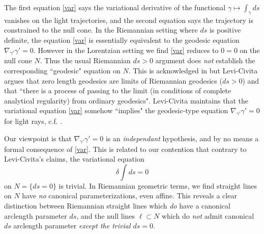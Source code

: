 \documentclass[12pt]{article}
\begin{document}
The first equation \eqref{var} says the variational derivative of the functional $\gamma \mapsto \int_\gamma ds$ vanishes on the light trajectories, and the second equation says the trajectory is constrained to the null cone. In the Riemannian setting where $ds$ is positive definite, the equation \eqref{var} is essentially equivalent to the geodesic equation $\nabla_{\gamma'} \gamma'=0$. However in the Lorentzian setting we find \eqref{var} reduces to $0=0$ on the null cone $N$. Thus the usual Riemannian $ds>0$ argument does \emph{not} establish the corresponding ``geodesic" equation on $N$. This is acknowledged in \cite[III.XI.14]{levi} but Levi-Civita argues that zero length geodesics are limits of Riemannian geodesics ($ds>0$) and that ``there is a process of passing to the limit (in conditions of complete analytical regularity) from ordinary geodesics". Levi-Civita maintains that the variational equation \eqref{var} somehow ``implies" the geodesic-type equation $\nabla_{\gamma'} \gamma'=0$ for light rays, c.f. \cite[III.XI.18]{levi}. 

Our viewpoint is that $\nabla_{\gamma'} \gamma'=0$ is an \emph{independant} hypothesis, and by no means a formal consequence of \eqref{var}. This is related to our contention that contrary to Levi-Civita's claims, the variational equation $$\delta \int ds =0$$ on $N=\{ds=0\}$ is trivial. In Riemannian geometric terms,  we find straight lines on $N$ have \emph{no} canonical parameterizations, even affine. This reveals a clear distinction between Riemannian straight lines which \emph{do} have a canonical arclength parameter $ds$, and the null lines $\ell \subset N$ which do \emph{not} admit canonical $ds$ arclength parameter \emph{except the trivial $ds=0$}. 




\end{document}
